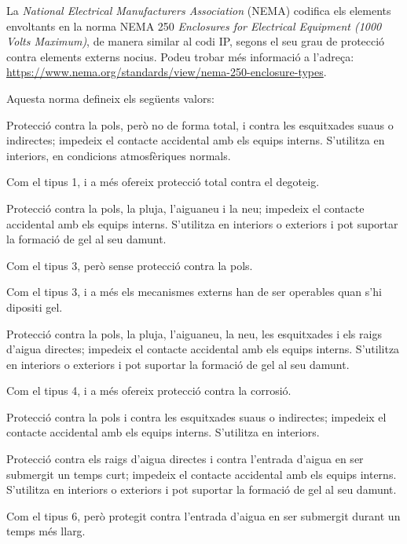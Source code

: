 La \textit{National Electrical Manufacturers Association} (NEMA)
codifica els elements envoltants en la norma NEMA 250 \textit{Enclosures for Electrical Equipment (1000 Volts Maximum)}, de manera similar al codi IP, segons el seu grau de protecció contra elements externs nocius. Podeu trobar més informació a l'adreça: \href{https://www.nema.org/standards/view/nema-250-enclosure-types}{https:/\!\!/www.nema.org/standards/view/nema-250-enclosure-types}.

Aquesta norma defineix els següents valors:

\begin{list}{}
	{\setlength{\labelwidth}{10mm} \setlength{\leftmargin}{15mm} \setlength{\labelsep}{5mm}}
	\item[1] Protecció contra la pols, però no de forma total, i contra les esquitxades suaus o indirectes; impedeix el contacte accidental amb els equips interns. S'utilitza en interiors, en condicions atmosfèriques normals.
	\item[2] Com el tipus 1, i a més ofereix protecció total contra el degoteig.
	\item[3] Protecció contra la pols, la pluja, l'aiguaneu i la neu; impedeix el contacte accidental amb els equips interns. S'utilitza en interiors o exteriors i pot suportar la formació de gel al seu damunt.
	\item[3R] Com el tipus 3, però sense protecció contra la pols.
	\item[3S] Com el tipus 3, i a més els mecanismes externs han de ser operables quan s'hi dipositi gel.
	\item[4] Protecció contra la pols, la pluja, l'aiguaneu, la neu, les esquitxades i els raigs d'aigua directes; impedeix el contacte accidental amb els equips interns. S'utilitza en interiors o exteriors i pot suportar la formació de gel al seu damunt.
	\item[4X] Com el tipus 4, i a més ofereix protecció contra la corrosió.
	\item[5] Protecció contra la pols i contra les esquitxades suaus o indirectes; impedeix el contacte accidental amb els equips interns. S'utilitza en interiors.
	\item[6] Protecció contra els raigs d'aigua directes i contra l'entrada d'aigua en ser submergit un temps curt; impedeix el contacte accidental amb els equips interns. S'utilitza en interiors o exteriors i pot suportar la formació de gel al seu damunt.
	\item[6P] Com el tipus 6, però protegit contra l'entrada d'aigua en ser submergit durant un temps més llarg.

\end{list}
